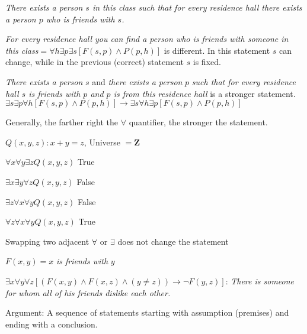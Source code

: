 \begin{remark}

\textit{There exists a person $s$ in this class such that for every residence hall there exists a person $p$ who is friends with $s$.}

\textit{For every residence hall you can find a person who is friends with someone in this class}$= \forall h \exists p \exists s [F(s, p) \land P(p, h)]$ is different. In this statement $s$ can change, while in the previous (correct) statement $s$ is fixed. 

\textit{There exists a person} $s$ and \textit{there exists a person} $p$ \textit{such that for every residence hall $s$ is friends with $p$ and $p$ is from this residence hall} is a stronger statement. $\exists s \exists p \forall h [F(s, p) \land P(p, h)] \rightarrow \exists s \forall h \exists p [F(s, p) \land P(p, h)]$

Generally, the farther right the $\forall$ quantifier, the stronger the statement.

\end{remark}

\begin{ex}

$Q(x, y, z): x + y = z$, Universe $= \mathbf{Z}$

$\forall x \forall y \exists z Q(x, y, z)$ True

$\exists x \exists y \forall z Q(x, y, z)$ False

$\exists z \forall x \forall y Q(x, y, z)$ False

$\forall z \forall x \forall y Q(x, y, z)$ True

\end{ex}

\begin{remark}

Swapping two adjacent $\forall$ or $\exists$ does not change the statement

\end{remark}

\begin{ex}

$F(x, y) = x$ \textit{is friends with} $y$

$\exists x \forall y \forall z [(F(x, y) \land F(x, z) \land (y \neq z)) \rightarrow \lnot F(y, z)]$: \textit{There is someone for whom all of his friends dislike each other.}

\end{ex}

\begin{defn}

Argument: A sequence of statements starting with assumption (premises) and ending with a conclusion.

\end{defn}

